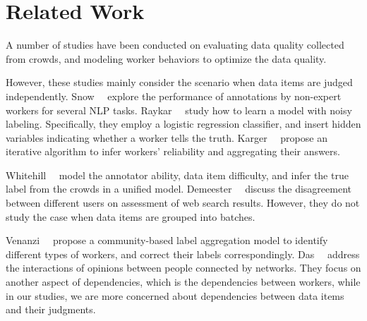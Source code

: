 

\section{Related Work}
\label{sec:related}



A number of studies have been conducted on evaluating data quality collected from crowds, 
and modeling worker behaviors to optimize the data quality.  

However, these studies mainly consider the scenario when data items are judged independently.  
Snow~\etal~\cite{snow:emnlp2008} explore the performance of annotations by non-expert workers for several NLP tasks.
Raykar~\etal~\cite{raykar:nips2011ranking,raykar:icml2009,raykar:jmlr2010}
study how to learn a model with noisy labeling. 
Specifically, they employ a logistic regression classifier, 
and insert hidden variables indicating whether a worker tells the truth. 
Karger~\etal~\cite{karger:nips2011} propose an iterative algorithm to infer workers' reliability 
and aggregating their answers.  

Whitehill~\etal~\cite{whitehill:nips2009} model the annotator ability, data item difficulty, and infer the true label from the crowds in a unified model.
Demeester~\etal~\cite{demeester:wsdm2014} discuss the disagreement between different users on assessment of web search results.
However, they do not study the case when data items are grouped into batches.

Venanzi~\etal~\cite{venanzi:www2014} propose a community-based label aggregation model to identify different types of workers, 
and correct their labels correspondingly.  
Das~\etal~\cite{das:kdd2013} address the interactions of opinions between people connected by networks.
They focus on another aspect of dependencies, 
which is the dependencies between workers, 
while in our studies, we are more concerned about dependencies between data items and their judgments.  



